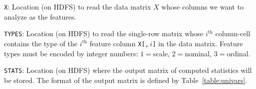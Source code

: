 \medskip
\pagebreak[2]
\begin{Description}
\item[{\tt X}:]
Location (on HDFS) to read the data matrix $X$ whose columns we want to
analyze as the features.
\item[{\tt TYPES}:] %
Location (on HDFS) to read the single-row matrix whose $i^{\textrm{th}}$
column-cell contains the type of the $i^{\textrm{th}}$ feature column
\texttt{X[,$\,i$]} in the data matrix.  Feature types must be encoded by
integer numbers: $1 = {}$scale, $2 = {}$nominal, $3 = {}$ordinal.
\item[{\tt STATS}:]
Location (on HDFS) where the output matrix of computed statistics
will be stored.  The format of the output matrix is defined by
Table~\ref{table:univars}.
\end{Description}

